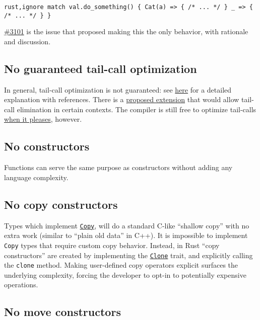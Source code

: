 \documentclass[]{article}
\begin{document}
\texttt{rust,ignore match val.do\_something() \{     Cat(a) =\textgreater{} \{ /* ... */ \}     \_      =\textgreater{} \{ /* ... */ \} \}}

\href{https://github.com/rust-lang/rust/issues/3101}{\#3101} is the
issue that proposed making this the only behavior, with rationale and
discussion.

\subsection{No guaranteed tail-call
optimization}\label{no-guaranteed-tail-call-optimization}

In general, tail-call optimization is not guaranteed: see
\href{https://mail.mozilla.org/pipermail/rust-dev/2013-April/003557.html}{here}
for a detailed explanation with references. There is a
\href{https://github.com/rust-lang/rfcs/pull/81}{proposed extension}
that would allow tail-call elimination in certain contexts. The compiler
is still free to optimize tail-calls
\href{http://llvm.org/docs/CodeGenerator.html\#sibling-call-optimization}{when
it pleases}, however.

\subsection{No constructors}\label{no-constructors}

Functions can serve the same purpose as constructors without adding any
language complexity.

\subsection{No copy constructors}\label{no-copy-constructors}

Types which implement
\href{http://doc.rust-lang.org/core/kinds/trait.Copy.html}{\texttt{Copy}},
will do a standard C-like ``shallow copy'' with no extra work (similar
to ``plain old data'' in C++). It is impossible to implement
\texttt{Copy} types that require custom copy behavior. Instead, in Rust
``copy constructors'' are created by implementing the
\href{http://doc.rust-lang.org/core/clone/trait.Clone.html}{\texttt{Clone}}
trait, and explicitly calling the \texttt{clone} method. Making
user-defined copy operators explicit surfaces the underlying complexity,
forcing the developer to opt-in to potentially expensive operations.

\subsection{No move constructors}\label{no-move-constructors}
\end{document}

